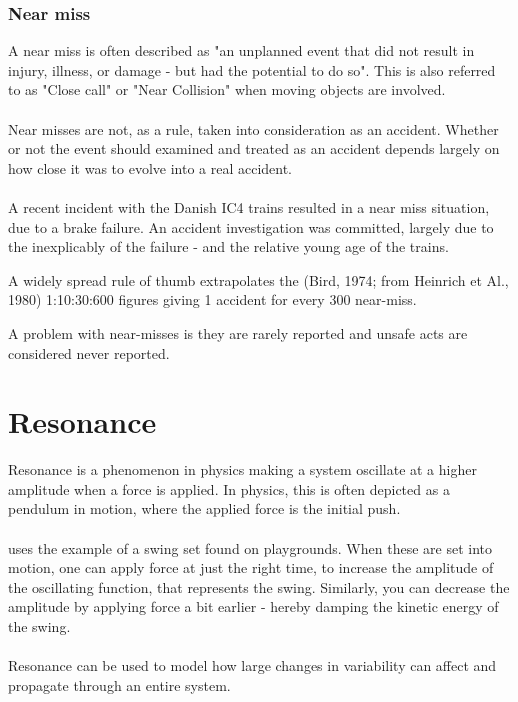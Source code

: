 \subsubsection{Near miss}
\label{sec:near_miss}
A near miss is often described as "an unplanned event that did not result in injury, illness, or damage - but had the potential to do so". This is also referred to as "Close call" or "Near Collision" when moving objects are involved.\\
\\
Near misses are not, as a rule, taken into consideration as an accident. Whether or not the event should examined and treated as an accident depends largely on how close it was to evolve into a real accident.\\
\\
A recent incident with the Danish IC4 trains resulted in a near miss situation, due to a brake failure. An accident investigation was committed, largely due to the inexplicably of the failure - and the relative young age of the trains.

A widely spread rule of thumb extrapolates the (Bird, 1974; from Heinrich et Al., 1980) 1:10:30:600 figures giving 1 accident for every 300 near-miss.

A problem with near-misses is they are rarely reported and unsafe acts are considered never reported.

\section{Resonance}
Resonance is a phenomenon in physics making a system oscillate at a higher amplitude when a force is applied. In physics, this is often depicted as a pendulum in motion, where the applied force is the initial push.\\
\\
\cite{hollnagel2004barriers} uses the example of a swing set found on playgrounds. When these are set into motion, one can apply force at just the right time, to increase the amplitude of the oscillating function, that represents the swing. Similarly, you can decrease the amplitude by applying force a bit earlier - hereby damping the kinetic energy of the swing.\\
\\
Resonance can be used to model how large changes in variability can affect and propagate through an entire system. 

